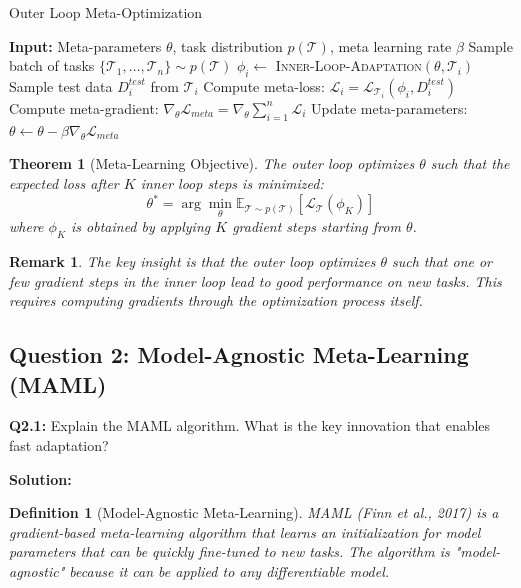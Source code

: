 \documentclass[12pt]{article}
\newtheorem{theorem}{Theorem}
\newtheorem{definition}{Definition}
\newtheorem{remark}{Remark}
\begin{document}
{{			\begin{algorithm}[H]
			\caption{Outer Loop Meta-Optimization}
			\begin{algorithmic}[1]
			\STATE \textbf{Input:} Meta-parameters $\theta$, task distribution $p(\mathcal{T})$, meta learning rate $\beta$
			\STATE Sample batch of tasks $\{\mathcal{T}_1, \ldots, \mathcal{T}_n\} \sim p(\mathcal{T})$
			\STATE $\phi_i \leftarrow$ \textsc{Inner-Loop-Adaptation}$(\theta, \mathcal{T}_i)$
			\STATE Sample test data $D_i^{test}$ from $\mathcal{T}_i$
			\STATE Compute meta-loss: $\mathcal{L}_i = \mathcal{L}_{\mathcal{T}_i}(\phi_i, D_i^{test})$
			\ENDFOR
			\STATE Compute meta-gradient: $\nabla_\theta \mathcal{L}_{meta} = \nabla_\theta \sum_{i=1}^{n} \mathcal{L}_i$
			\STATE Update meta-parameters: $\theta \leftarrow \theta - \beta \nabla_\theta \mathcal{L}_{meta}$
			\end{algorithmic}
			\end{algorithm}
			
			\begin{theorem}[Meta-Learning Objective]
			The outer loop optimizes $\theta$ such that the expected loss after $K$ inner loop steps is minimized:
			\begin{equation}
			\theta^* = \arg\min_\theta \mathbb{E}_{\mathcal{T} \sim p(\mathcal{T})} \left[ \mathcal{L}_{\mathcal{T}}(\phi_K) \right]
			\end{equation}
			where $\phi_K$ is obtained by applying $K$ gradient steps starting from $\theta$.
			\end{theorem}
			
			\begin{remark}
			The key insight is that the outer loop optimizes $\theta$ such that one or few gradient steps in the inner loop lead to good performance on new tasks. This requires computing gradients through the optimization process itself.
			\end{remark}
			
			\subsection{Question 2: Model-Agnostic Meta-Learning (MAML)}
			
			\textbf{Q2.1:} Explain the MAML algorithm. What is the key innovation that enables fast adaptation?
			
			\textbf{Solution:}
			
			\begin{definition}[Model-Agnostic Meta-Learning]
			MAML (Finn et al., 2017) is a gradient-based meta-learning algorithm that learns an initialization for model parameters that can be quickly fine-tuned to new tasks. The algorithm is "model-agnostic" because it can be applied to any differentiable model.
			\end{definition}
			
}}
\end{document}
